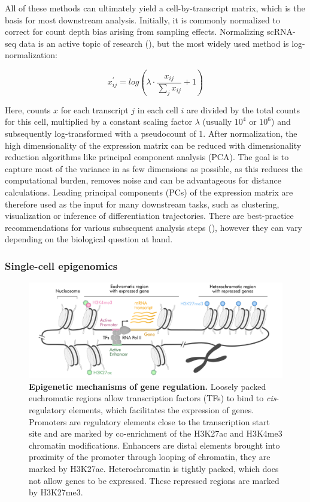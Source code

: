 All of these methods can ultimately yield a cell-by-transcript matrix, which is the basis for most downstream analysis. Initially, it is commonly normalized to correct for count depth bias arising from sampling effects. 
Normalizing scRNA-seq data is an active topic of research (\cite{lause_analytic_2021,hafemeister_normalization_2019,townes_feature_2019,vallejos_normalizing_2017}), but the most widely used method is log-normalization:

\[ x^{\prime}_{ij} = log(\lambda \cdot  \frac{x_{ij}}{\sum_{j}{x_{ij}}} + 1)  \]

Here, counts $x$ for each transcript $j$ in each cell $i$ are divided by the total counts for this cell, multiplied by a constant scaling factor $\lambda$ (usually $10^4$ or $10^6$) and subsequently log-transformed with a pseudocount of 1. After normalization, the high dimensionality of the expression matrix can be reduced with dimensionality reduction algorithms like principal component analysis (PCA). The goal is to capture most of the variance in as few dimensions as possible, as this reduces the computational burden, removes noise and can be advantageous for distance calculations. Leading principal components (PCs) of the expression matrix are therefore used as the input for many downstream tasks, such as clustering, visualization or inference of differentiation trajectories. There are best-practice recommendations for various subsequent analysis steps (\cite{luecken_current_2019}), however they can vary depending on the biological question at hand.


\subsubsection{Single-cell epigenomics}

\begin{figure}[t!]
  \centering
\includegraphics[width=\textwidth]{figures/introduction/Figure_3}
  \caption{\textbf{Epigenetic mechanisms of gene regulation.} Loosely packed euchromatic regions allow transcription factors (TFs) to bind to \textit{cis}-regulatory elements, which facilitates the expression of genes. Promoters are regulatory elements close to the transcription start site and are marked by co-enrichment of the H3K27ac and H3K4me3 chromatin modifications. Enhancers are distal elements brought into proximity of the promoter through looping of chromatin, they are marked by H3K27ac. Heterochromatin is tightly packed, which does not allow genes to be expressed. These repressed regions are marked by H3K27me3.}
  \label{fig:intro3}
\end{figure}

